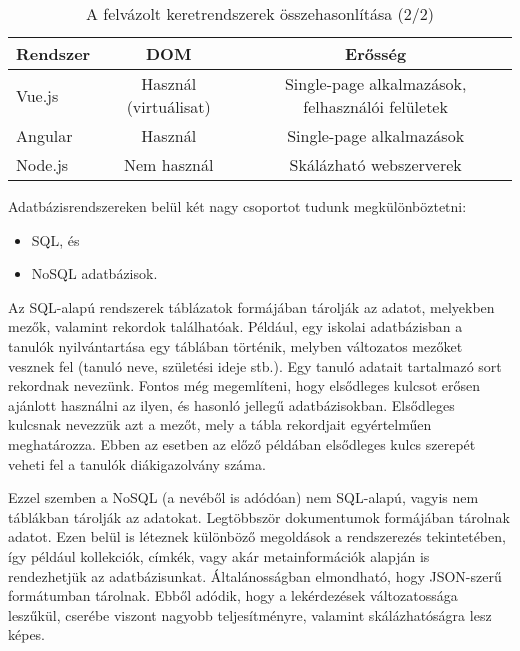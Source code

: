\begin{table}[h]
\centering
\caption{A felvázolt keretrendszerek összehasonlítása (2/2)}
\label{tab:keretrendszerek2}
\begin{tabular}{|l|c|c|}
\hline
Rendszer & DOM & Erősség\\
\hline
Vue.js & Használ (virtuálisat) & Single-page alkalmazások, felhasználói felületek\\
\hline
Angular & Használ & Single-page alkalmazások\\
\hline
Node.js & Nem használ & Skálázható webszerverek\\
\hline
\end{tabular}
\end{table}



Adatbázisrendszereken belül két nagy csoportot tudunk megkülönböztetni:
\begin{itemize}
\item SQL, és
\item NoSQL adatbázisok.
\end{itemize}
Az SQL-alapú rendszerek táblázatok formájában tárolják az adatot, melyekben mezők, valamint rekordok találhatóak. Például, egy iskolai adatbázisban a tanulók nyilvántartása egy táblában történik, melyben változatos mezőket vesznek fel (tanuló neve, születési ideje stb.). Egy tanuló adatait tartalmazó sort rekordnak nevezünk. Fontos még megemlíteni, hogy elsődleges kulcsot erősen ajánlott használni az ilyen, és hasonló jellegű adatbázisokban. Elsődleges kulcsnak nevezzük azt a mezőt, mely a tábla rekordjait egyértelműen meghatározza. Ebben az esetben az előző példában elsődleges kulcs szerepét veheti fel a tanulók diákigazolvány száma.

Ezzel szemben a NoSQL (a nevéből is adódóan) nem SQL-alapú, vagyis nem táblákban tárolják az adatokat. Legtöbbször dokumentumok formájában tárolnak adatot. Ezen belül is léteznek különböző megoldások a rendszerezés tekintetében, így például kollekciók, címkék, vagy akár metainformációk alapján is rendezhetjük az adatbázisunkat. Általánosságban elmondható, hogy JSON-szerű formátumban tárolnak. Ebből adódik, hogy a lekérdezések változatossága leszűkül, cserébe viszont nagyobb teljesítményre, valamint skálázhatóságra lesz képes.

